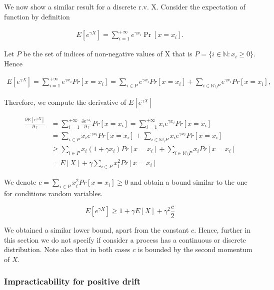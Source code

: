 \documentclass[12pt, a4paper]{article}
\theoremstyle{remark}
\newcommand{\der}[2]{\frac{\partial #1}{\partial #2}}
\begin{document}
We now show a similar result for a discrete r.v. X. Consider the expectation of function by definition

\begin{align*}
    E[e^{\gamma X}] = \sum_{i = 1}^{+\infty} e^{\gamma x_i} \Pr[x = x_i].
\end{align*}


Let $P$ be the set of indices of non-negative values of X that is \(P = \{i \in \mathbb{N} : x_i \geq 0\}\). Hence

\begin{align*}
    E[e^{\gamma X}] = \sum_{i = 1}^{+\infty} e^{\gamma x_i} Pr[x = x_i] = \sum_{i \in P} e^{\gamma x_i} Pr[x = x_i] + \sum_{i \in \mathbb{N}\setminus P} e^{\gamma x_i} Pr[x = x_i],
\end{align*}

Therefore, we compute the derivative of \(E\left[e^{\gamma X}\right]\)

\begin{align*}
    \der{E[e^{\gamma X}]}{\gamma} & = \sum_{i = 1}^{+\infty} \frac{\partial e^{\gamma x_i}}{\partial \gamma} Pr[x = x_i] = \sum_{i = 1}^{+\infty} x_i e^{\gamma x_i} Pr[x = x_i] \\
                                  & = \sum_{i \in P} x_i e^{\gamma x_i} Pr[x = x_i] + \sum_{i \in \mathbb{N}\setminus P} x_i e^{\gamma x_i} Pr[x = x_i]                          \\
                                  & \geq \sum_{i \in P} x_i (1 + {\gamma x_i}) Pr[x = x_i] + \sum_{i \in \mathbb{N}\setminus P} x_i Pr[x = x_i]                                  \\
                                  & = E[X] + \gamma\sum_{i \in P} x_i^2 Pr[x = x_i]
\end{align*}

We denote $c = \sum_{i \in P} x_i^2 Pr[x = x_i] \geq 0$ and obtain a bound similar to the one for conditions random variables.

\[
    E[e^{\gamma X}] \geq 1 + \gamma E[X] + \gamma^2 \frac{c}{2}
\]


We obtained a similar lower bound, apart from the constant \(c\). Hence,
further in this section we do not specify if consider a process has a continuous or discrete distribution. Note also that in both cases \(c\) is bounded by the second momentum of \(X\).

\subsubsection{Impracticability for positive drift}
\end{document}

